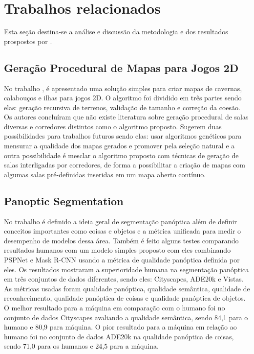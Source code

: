 \section{Trabalhos relacionados}

Esta seção destina-se a análise e discussão da metodologia e dos resultados prospostos por \space{}. 

\subsection*{Geração Procedural de Mapas para Jogos 2D}

No trabalho \space{}, é apresentado uma solução simples para criar mapas de cavernas, calabouços e ilhas para jogos 2D. O algoritmo foi dividido em três partes sendo elas: geração recursiva de terrenos, validação de tamanho e correção da coesão. Os autores concluíram que não existe literatura sobre geração procedural de salas diversas e corredores distintos como o algoritmo proposto. Sugerem duas possibilidades para trabalhos futuros sendo elas: usar algoritmos genéticos para mensurar a qualidade dos mapas gerados e promover pela seleção natural e a outra possibilidade é mesclar o algoritmo proposto com técnicas de geração de salas interligadas por corredores, de forma a possibilitar a criação de mapas com algumas salas pré-definidas inseridas em um mapa aberto contínuo.

\subsection*{Panoptic Segmentation}

No trabalho \space{} é definido a ideia geral de segmentação panóptica além de definir conceitos importantes como coisas e objetos e a métrica unificada para medir o desempenho de modelos dessa área. Também é feito alguns testes comparando resultados humanos com um modelo simples proposto com eles combinando PSPNet e Mask R-CNN usando a métrica de qualidade panóptica definida por eles. Os resultados mostraram a superioridade humana na segmentação panóptica em três conjuntos de dados diferentes, sendo eles: Cityscapes, ADE20k e Vistas. As métricas usadas foram qualidade panóptica, qualidade semântica, qualidade de reconhecimento, qualidade panóptica
 de coisas e qualidade panóptica de objetos. O melhor resultado para a máquina em comparação com o humano foi no conjunto de dados Cityscapes avaliando a qualidade semântica, sendo 84,1 para o humano e 80,9 para máquina. O pior resultado para a máquina em relação ao humano foi no conjunto de dados ADE20k na qualidade panóptica de coisas, sendo 71,0 para os humanos e 24,5 para a máquina.

